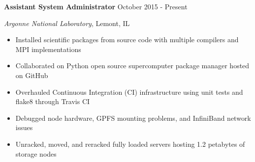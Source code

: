 
\textbf{Assistant System Administrator} \hfill October 2015 - Present

\textit{Argonne National Laboratory}, Lemont, IL

\begin{itemize}
    \item Installed scientific packages from source code with multiple compilers and MPI implementations
    \item Collaborated on Python open source supercomputer package manager hosted on GitHub
    \item Overhauled Continuous Integration (CI) infrastructure using unit tests and flake8 through Travis CI
    \item Debugged node hardware, GPFS mounting problems, and InfiniBand network issues
    \item Unracked, moved, and reracked fully loaded servers hosting 1.2 petabytes of storage nodes
\end{itemize}
